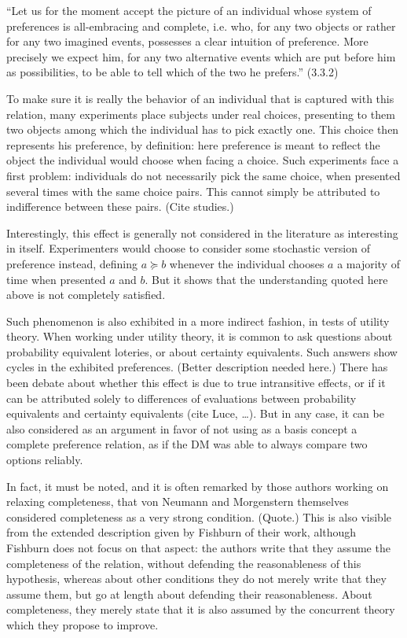 \documentclass[french, english]{llncs}
\begin{document}
“Let us for the moment accept the picture of an individual whose system of preferences is all-embracing and complete, i.e. who, for any two objects or rather for any two imagined events, possesses a clear intuition of preference. More precisely we expect him, for any two alternative events which are put before him as possibilities, to be able to tell which of the two he prefers.” (3.3.2)

To make sure it is really the behavior of an individual that is captured with this relation, many experiments place subjects under real choices, presenting to them two objects among which the individual has to pick exactly one. This choice then represents his preference, by definition: here preference is meant to reflect the object the individual would choose when facing a choice. Such experiments face a first problem: individuals do not necessarily pick the same choice, when presented several times with the same choice pairs. This cannot simply be attributed to indifference between these pairs. (Cite studies.)

Interestingly, this effect is generally not considered in the literature as interesting in itself. Experimenters would choose to consider some stochastic version of preference instead, defining $a \succeq b$ whenever the individual chooses $a$ a majority of time when presented $a$ and $b$. But it shows that the understanding quoted here above is not completely satisfied.

Such phenomenon is also exhibited in a more indirect fashion, in tests of utility theory. When working under utility theory, it is common to ask questions about probability equivalent loteries, or about certainty equivalents. Such answers show cycles in the exhibited preferences. (Better description needed here.) There has been debate about whether this effect is due to true intransitive effects, or if it can be attributed solely to differences of evaluations between probability equivalents and certainty equivalents (cite Luce, …). But in any case, it can be also considered as an argument in favor of not using as a basis concept a complete preference relation, as if the \ac{DM} was able to always compare two options reliably.

In fact, it must be noted, and it is often remarked by those authors working on relaxing completeness, that von Neumann and Morgenstern themselves considered completeness as a very strong condition. (Quote.) This is also visible from the extended description given by Fishburn of their work, although Fishburn does not focus on that aspect: the authors write that they assume the completeness of the relation, without defending the reasonableness of this hypothesis, whereas about other conditions they do not merely write that they assume them, but go at length about defending their reasonableness. About completeness, they merely state that it is also assumed by the concurrent theory which they propose to improve.
\end{document}
